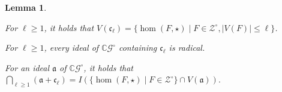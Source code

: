 \documentclass[11pt]{scrartcl}
\theoremstyle{definition}
\theoremstyle{plain}
\newtheorem{lemma}[definition]{Lemma}
\theoremstyle{remark}
\newcommand{\lG}{\mathcal{G}^\circ}
\newcommand{\lZ}{\mathcal{Z}^\circ}
\newcommand{\C}{\mathbb{C}}
\begin{document}
	\begin{lemma}\label{lem:intersection-vanishing}
        \begin{assertions}
            \item\label{it:intersection-vanishing1} For $\ell \geq 1$, it holds that $V(\mathfrak{c}_\ell) = \{\hom(F, \star) \mid F \in \lZ, |V(F)| \leq \ell\}$.
            \item\label{it:intersection-vanishing2} For $\ell \geq 1$, every ideal of  $\C\lG$ containing $\mathfrak{c}_\ell$ is radical.
            \item For an ideal $\mathfrak{a}$ of $\C\lG$, it holds that $\bigcap_{\ell \geq 1} (\mathfrak{a} + \mathfrak{c}_\ell)
			= I(\{\hom(F,\star) \mid F \in \lZ \} \cap V(\mathfrak{a})).$
        \end{assertions}
	\end{lemma}
\end{document}
